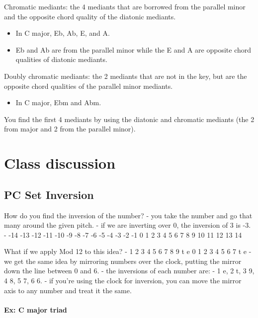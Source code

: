 \documentclass{book}
\providecommand{\tightlist}{%
  \setlength{\itemsep}{0pt}\setlength{\parskip}{0pt}}
\begin{document}
Chromatic mediants: the 4 mediants that are borrowed from the parallel minor
and the opposite chord quality of the diatonic mediants.

\begin{itemize}
\item
  In C major, Eb, Ab, E, and A.
\item
  Eb and Ab are from the parallel minor while the E and A are opposite chord
  qualities of diatonic mediants.
\end{itemize}

Doubly chromatic mediants: the 2 mediants that are not in the key, but are the
opposite chord qualities of the parallel minor mediants.

\begin{itemize}
\tightlist
\item
  In C major, Ebm and Abm.
\end{itemize}

You find the first 4 mediants by using the diatonic and chromatic mediants
(the 2 from major and 2 from the parallel minor).

\hypertarget{class-discussion-39}{%
\chapter{Class discussion}\label{class-discussion-39}}

\hypertarget{pc-set-inversion}{%
\section{PC Set Inversion}\label{pc-set-inversion}}

How do you find the inversion of the number? - you take the number and go that
many around the given pitch. - if we are inverting over 0, the inversion of 3
is -3. - -14 -13 -12 -11 -10 -9 -8 -7 -6 -5 -4 -3 -2 -1 0 1 2 3 4 5 6 7 8 9 10
11 12 13 14

What if we apply Mod 12 to this idea? - 1 2 3 4 5 6 7 8 9 t e 0 1 2 3 4 5 6 7
t e - we get the same idea by mirroring numbers over the clock, putting the
mirror down the line between 0 and 6. - the inversions of each number are: - 1
e, 2 t, 3 9, 4 8, 5 7, 6 6. - if you're using the clock for inversion, you can
move the mirror axis to any number and treat it the same.

\hypertarget{ex-c-major-triad}{%
\subsubsection{Ex: C major triad}\label{ex-c-major-triad}}
\end{document}
